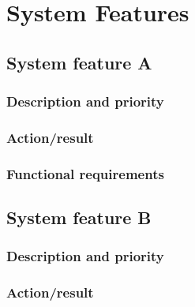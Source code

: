 \documentclass[10pt]{article}
\begin{document}




\section{System Features}

\subsection{System feature A}

\lipsum[10]

\subsubsection{Description and priority}

\lipsum[10]

\subsubsection{Action/result}

\lipsum[10]

\subsubsection{ Functional requirements}

\lipsum[10]








\subsection{System feature B}

\subsubsection{Description and priority}

\lipsum[10]

\subsubsection{Action/result}
\end{document}
